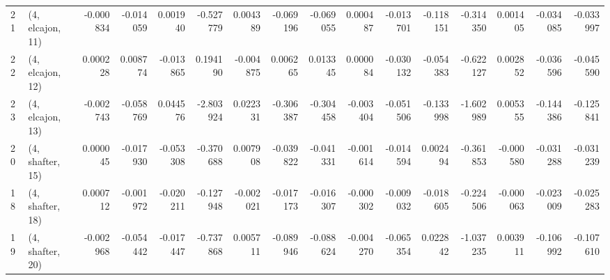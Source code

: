 \begin{tabular}{llrrrrrrrrrrrrrr}
21 &  (4, elcajon, 11) &  -0.000834 & -0.014059 &  0.001940 &  -0.527779 &  0.004389 &  -0.069196 & -0.069055 &  0.000487 & -0.013701 & -0.118151 &  -0.314350 &  0.001405 & -0.034085 & -0.033997 \\
22 &  (4, elcajon, 12) &   0.000228 &  0.008774 & -0.013865 &   0.194190 & -0.004875 &   0.006265 &  0.013345 &  0.000084 & -0.030132 & -0.054383 &  -0.622127 &  0.002852 & -0.036596 & -0.045590 \\
23 &  (4, elcajon, 13) &  -0.002743 & -0.058769 &  0.044576 &  -2.803924 &  0.022331 &  -0.306387 & -0.304458 & -0.003404 & -0.051506 & -0.133998 &  -1.602989 &  0.005355 & -0.144386 & -0.125841 \\
20 &  (4, shafter, 15) &   0.000045 & -0.017930 & -0.053308 &  -0.370688 &  0.007908 &  -0.039822 & -0.041331 & -0.001614 & -0.014594 &  0.002494 &  -0.361853 & -0.000580 & -0.031288 & -0.031239 \\
18 &  (4, shafter, 18) &   0.000712 & -0.001972 & -0.020211 &  -0.127948 & -0.002021 &  -0.017173 & -0.016307 & -0.000302 & -0.009032 & -0.018605 &  -0.224506 & -0.000063 & -0.023009 & -0.025283 \\
19 &  (4, shafter, 20) &  -0.002968 & -0.054442 & -0.017447 &  -0.737868 &  0.005711 &  -0.089946 & -0.088624 & -0.004270 & -0.065354 &  0.022842 &  -1.037235 &  0.003911 & -0.106992 & -0.107610 \\
\bottomrule
\end{tabular}
